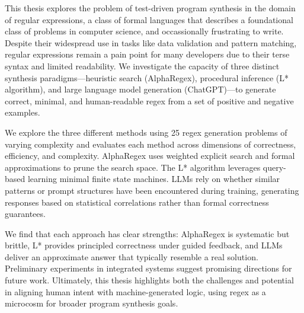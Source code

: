 
\pagestyle{plain}
\setcounter{page}{1}



\indent\indent This thesis explores the problem of test-driven program synthesis in the domain of regular expressions, a class of formal languages that describes a foundational class of problems in computer science, and occassionally frustrating to write. Despite their widespread use in tasks like data validation and pattern matching, regular expressions remain a pain point for many developers due to their terse syntax and limited readability. We investigate the capacity of three distinct synthesis paradigms—heuristic search (AlphaRegex), procedural inference (L* algorithm), and large language model generation (ChatGPT)—to generate correct, minimal, and human-readable regex from a set of positive and negative examples.

\indent\indent We explore the three different methods using 25 regex generation problems of varying complexity and evaluates each method across dimensions of correctness, efficiency, and complexity. AlphaRegex uses weighted explicit search and formal approximations to prune the search space. The L* algorithm leverages query-based learning minimal finite state machines. LLMs rely on whether similar patterns or prompt structures have been encountered during training, generating responses based on statistical correlations rather than formal correctness guarantees.

\indent\indent We find that each approach has clear strengths: AlphaRegex is systematic but brittle, L* provides principled correctness under guided feedback, and LLMs deliver an approximate answer that typically resemble a real solution. Preliminary experiments in integrated systems suggest promising directions for future work. Ultimately, this thesis highlights both the challenges and potential in aligning human intent with machine-generated logic, using regex as a microcosm for broader program synthesis goals.
 

\pagebreak{}
